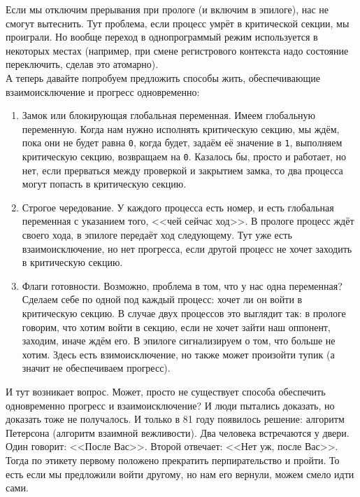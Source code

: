 \documentclass{article}
\begin{document}
    Если мы отключим прерывания при прологе (и включим в эпилоге), нас не смогут вытеснить. Тут проблема, если процесс умрёт в критической секции, мы проиграли. Но вообще переход в однопрограммый режим используется в некоторых местах (например, при смене регистрового контекста надо состояние переключить, сделав это атомарно).\\
    А теперь давайте попробуем предложить способы жить, обеспечивающие взаимоисключение и прогресс одновременно:
    \begin{enumerate}
        \item Замок или блокирующая глобальная переменная. Имеем глобальную переменную. Когда нам нужно исполнять критическую секцию, мы ждём, пока они не будет равна \Verb|0|, когда будет, задаём её значение в \Verb|1|, выполняем критическую секцию, возвращаем на \Verb|0|. Казалось бы, просто и работает, но нет, если прерваться между проверкой и закрытием замка, то два процесса могут попасть в критическую секцию.
        \item Строгое чередование. У каждого процесса есть номер, и есть глобальная переменная с указанием того, <<чей сейчас ход>>. В прологе процесс ждёт своего хода, в эпилоге передаёт ход следующему. Тут уже есть взаимоисключение, но нет прогресса, если другой процесс не хочет заходить в критическую секцию.
        \item Флаги готовности. Возможно, проблема в том, что у нас одна переменная? Сделаем себе по одной под каждый процесс: хочет ли он войти в критическую секцию. В случае двух процессов это выглядит так: в прологе говорим, что хотим войти в секцию, если не хочет зайти наш оппонент, заходим, иначе ждём его. В эпилоге сигнализируем о том, что больше не хотим. Здесь есть взимоисключение, но также может произойти тупик (а значит не обеспечиваем прогресс).
    \end{enumerate}
    И тут возникает вопрос. Может, просто не существует способа обеспечить одновременно прогресс и взаимоисключение? И люди пытались доказать, но доказать тоже не получалось. И только в 81 году появилось решение: алгоритм Петерсона (алгоритм взаимной вежливости). Два человека встречаются у двери. Один говорит: <<После Вас>>. Второй отвечает: <<Нет уж, после Вас>>. Тогда по этикету первому положено прекратить перпирательство и пройти. То есть если мы предложили войти другому, но нам его вернули, можем смело идти сами.
\end{document}
